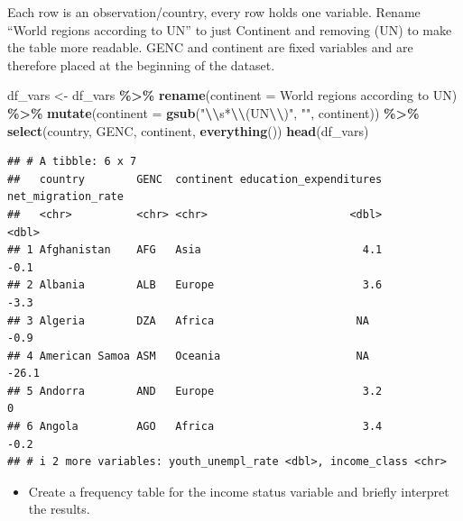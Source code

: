 \documentclass[
]{article}
\newenvironment{Shaded}{\begin{snugshade}}{\end{snugshade}}
\newcommand{\AttributeTok}[1]{\textcolor[rgb]{0.13,0.29,0.53}{#1}}
\newcommand{\FunctionTok}[1]{\textcolor[rgb]{0.13,0.29,0.53}{\textbf{#1}}}
\newcommand{\NormalTok}[1]{#1}
\newcommand{\OtherTok}[1]{\textcolor[rgb]{0.56,0.35,0.01}{#1}}
\newcommand{\SpecialCharTok}[1]{\textcolor[rgb]{0.81,0.36,0.00}{\textbf{#1}}}
\newcommand{\StringTok}[1]{\textcolor[rgb]{0.31,0.60,0.02}{#1}}
\providecommand{\tightlist}{%
  \setlength{\itemsep}{0pt}\setlength{\parskip}{0pt}}
\begin{document}
Each row is an observation/country, every row holds one variable. Rename
``World regions according to UN'' to just Continent and removing (UN) to
make the table more readable. GENC and continent are fixed variables and
are therefore placed at the beginning of the dataset.

\begin{Shaded}
\begin{Highlighting}[]
\NormalTok{df\_vars }\OtherTok{\textless{}{-}}\NormalTok{ df\_vars }\SpecialCharTok{\%\textgreater{}\%}
  \FunctionTok{rename}\NormalTok{(}\AttributeTok{continent =} \StringTok{\textasciigrave{}}\AttributeTok{World regions according to UN}\StringTok{\textasciigrave{}}\NormalTok{) }\SpecialCharTok{\%\textgreater{}\%}
  \FunctionTok{mutate}\NormalTok{(}\AttributeTok{continent =} \FunctionTok{gsub}\NormalTok{(}\StringTok{"}\SpecialCharTok{\textbackslash{}\textbackslash{}}\StringTok{s*}\SpecialCharTok{\textbackslash{}\textbackslash{}}\StringTok{(UN}\SpecialCharTok{\textbackslash{}\textbackslash{}}\StringTok{)"}\NormalTok{, }\StringTok{""}\NormalTok{, continent)) }\SpecialCharTok{\%\textgreater{}\%}
  \FunctionTok{select}\NormalTok{(country, GENC, continent, }\FunctionTok{everything}\NormalTok{())}
\FunctionTok{head}\NormalTok{(df\_vars)}
\end{Highlighting}
\end{Shaded}

\begin{verbatim}
## # A tibble: 6 x 7
##   country        GENC  continent education_expenditures net_migration_rate
##   <chr>          <chr> <chr>                      <dbl>              <dbl>
## 1 Afghanistan    AFG   Asia                         4.1               -0.1
## 2 Albania        ALB   Europe                       3.6               -3.3
## 3 Algeria        DZA   Africa                      NA                 -0.9
## 4 American Samoa ASM   Oceania                     NA                -26.1
## 5 Andorra        AND   Europe                       3.2                0  
## 6 Angola         AGO   Africa                       3.4               -0.2
## # i 2 more variables: youth_unempl_rate <dbl>, income_class <chr>
\end{verbatim}

\begin{itemize}
\tightlist
\item
  Create a frequency table for the income status variable and briefly
  interpret the results.
\end{itemize}
\end{document}
